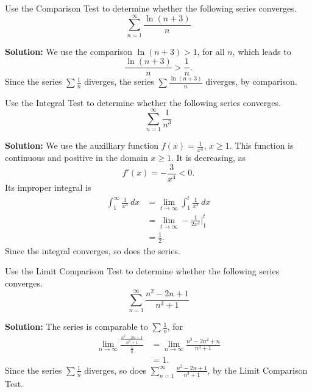 \documentclass[11pt]{exam}
\begin{document}
\begin{questions}
\begin{parts}
\vfill
\end{parts}
\newpage
\addpoints
\question[1] Use the Comparison Test to determine whether the following series converges. 
\begin{equation*}
\sum_{n=1}^{\infty} \frac{\ln(n+3)}{n}
\end{equation*}

\textbf{Solution:} We use the comparison $\ln(n+3) >1$, for all $n$, which leads to 
\begin{equation*}
\frac{\ln(n+3)}{n} > \frac{1}{n}.
\end{equation*}
Since the series $\sum \frac{1}{n}$ diverges, the series $\sum \frac{\ln(n+3)}{n}$ diverges, by comparison. 

\newpage 
\addpoints
\question[1] Use the Integral Test to determine whether the following series converges. 
\begin{equation*}
\sum_{n=1}^{\infty} \frac{1}{n^3}
\end{equation*}

\textbf{Solution:} We use the auxilliary function $f(x)=\frac{1}{x^3}$, $x \geq 1$. This function is continuous and positive in the domain $x \geq 1$. It is decreasing, as 
\begin{equation*}
f'(x)=-\frac{3}{x^4} <0.
\end{equation*}
Its improper integral is 
\begin{align*}
\int_{1}^{\infty} \frac{1}{x^3} \ dx & = \lim_{t \to \infty} \int_{1}^{t} \frac{1}{x^3} \ dx \\
& = \lim_{t \to \infty} -\frac{1}{2x^2} \Big|_{1}^{t} \\
& = \frac{1}{2}.
\end{align*}
Since the integral converges, so does the series. 


\newpage
\addpoints
\question[1] Use the Limit Comparison Test to determine whether the following series converges. 
\begin{equation*}
\sum_{n=1}^{\infty} \frac{n^2-2n+1}{n^3+1}
\end{equation*}

\textbf{Solution:} The series is comparable to $\sum \frac{1}{n}$, for 
\begin{align*}
\lim_{n \to \infty} \frac{\frac{n^2-2n+1}{n^3+1}}{\frac{1}{n}} & = \lim_{n \to \infty} \frac{n^3-2n^2+n}{n^3+1} \\
& = 1.
\end{align*}
Since the series $\sum \frac{1}{n}$ diverges, so does $\sum_{n=1}^{\infty} \frac{n^2-2n+1}{n^3+1}$, by the Limit Comparison Test. 


\end{questions}
\end{document}
